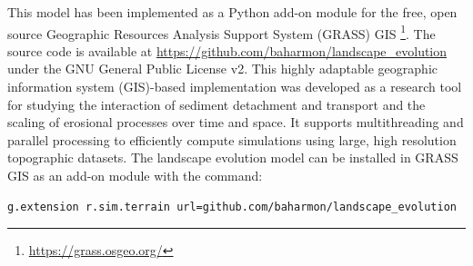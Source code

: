 \documentclass[esurf, manuscript]{copernicus}
\begin{document}
This model has been implemented 
as a Python add-on module 
for the free, open source
Geographic Resources Analysis Support System (GRASS) GIS
\footnote{\url{https://grass.osgeo.org/}}. 
The source code is available at 
\url{https://github.com/baharmon/landscape\_evolution} 
under the GNU General Public License v2. %
%
This highly adaptable
geographic information system (GIS)-based implementation
was developed as a research tool for studying 
the interaction of sediment detachment and transport
and the scaling of erosional processes over time and space. %
It supports multithreading and parallel processing
to efficiently compute simulations 
using large, high resolution topographic datasets.
%
The landscape evolution model 
can be installed in GRASS GIS as an add-on module 
with the command: 
\begin{lstlisting}
g.extension r.sim.terrain url=github.com/baharmon/landscape_evolution
\end{lstlisting}




\end{document}

